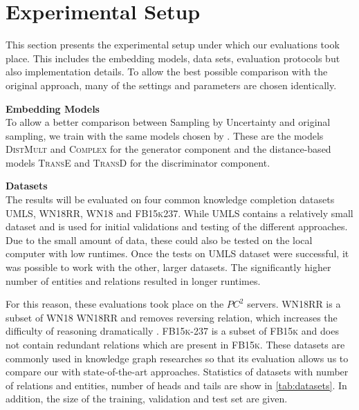 \section{Experimental Setup}
\label{ch:evaluation:sec:experimental_setup}

This section presents the experimental setup under which our evaluations took place.
This includes the embedding models, data sets, evaluation protocols but also implementation details.
To allow the best possible comparison with the original \kbgan approach, many of the settings and parameters are chosen identically.

\textbf{Embedding Models}\\
To allow a better comparison between Sampling by Uncertainty and original sampling, we train with the same models chosen by \kbgan.
These are the models \textsc{DistMult} and \textsc{Complex} for the generator component and the distance-based models \textsc{TransE} and \textsc{TransD} for the discriminator component.

\textbf{Datasets}\\
The results will be evaluated on four common knowledge completion datasets  \textsc{UMLS}, \textsc{WN18RR}, \textsc{WN18} 
and \textsc{FB15k237}.
While \textsc{UMLS} contains a relatively small dataset and is used for initial validations and testing of the different approaches.
Due to the small amount of data, these could also be tested on the local computer with low runtimes.
Once the tests on \textsc{UMLS} dataset were successful, it was possible to work with the other, larger datasets.
The significantly higher number of entities and relations resulted in longer runtimes.

For this reason, these evaluations took place on the $PC^2$ servers.
\textsc{WN18RR} is a subset of \textsc{WN18} \textsc{WN18RR} and removes reversing relation, which increases the difficulty of reasoning dramatically \cite{cai2017kbgan}.
\textsc{FB15k-237} is a subset of \textsc{FB15k} and does not contain redundant relations which are present in \textsc{FB15k}.
These datasets are commonly used in knowledge graph researches so that its evaluation allows us to compare our with state-of-the-art approaches.
Statistics of datasets with number of relations and entities, number of heads and tails are show in \autoref{tab:datasets}. 
In addition, the size of the training, validation and test set are given.
        
